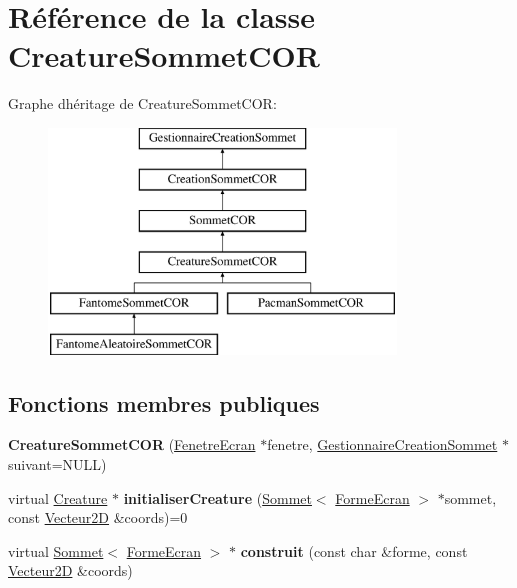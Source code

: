 \hypertarget{class_creature_sommet_c_o_r}{}\section{Référence de la classe Creature\+Sommet\+C\+OR}
\label{class_creature_sommet_c_o_r}
Graphe d\textquotesingle{}héritage de Creature\+Sommet\+C\+OR\+:\begin{figure}[H]
\begin{center}
\leavevmode
\includegraphics[height=6.000000cm]{class_creature_sommet_c_o_r}
\end{center}
\end{figure}
\subsection*{Fonctions membres publiques}
\begin{DoxyCompactItemize}
\item 
\mbox{\label{class_creature_sommet_c_o_r_a50fa89edceca8136b18b592967cf5b96}} 
{\bfseries Creature\+Sommet\+C\+OR} (\mbox{\hyperlink{class_fenetre_ecran}{Fenetre\+Ecran}} $\ast$fenetre, \mbox{\hyperlink{class_gestionnaire_creation_sommet}{Gestionnaire\+Creation\+Sommet}} $\ast$suivant=N\+U\+LL)
\item 
\mbox{\label{class_creature_sommet_c_o_r_aed3d8b845bcc2512afce456bdb3a732b}} 
virtual \mbox{\hyperlink{class_creature}{Creature}} $\ast$ {\bfseries initialiser\+Creature} (\mbox{\hyperlink{class_sommet}{Sommet}}$<$ \mbox{\hyperlink{class_forme_ecran}{Forme\+Ecran}} $>$ $\ast$sommet, const \mbox{\hyperlink{class_vecteur2_d}{Vecteur2D}} \&coords)=0
\item 
\mbox{\label{class_creature_sommet_c_o_r_aff55d08233c54a0bd03d50658325c246}} 
virtual \mbox{\hyperlink{class_sommet}{Sommet}}$<$ \mbox{\hyperlink{class_forme_ecran}{Forme\+Ecran}} $>$ $\ast$ {\bfseries construit} (const char \&forme, const \mbox{\hyperlink{class_vecteur2_d}{Vecteur2D}} \&coords)
\end{DoxyCompactItemize}
